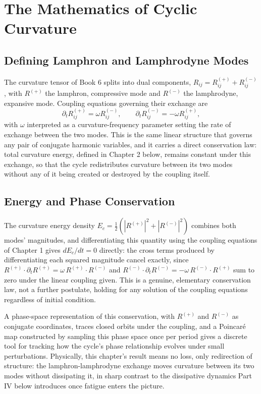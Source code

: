 \part{The Mathematics of Cyclic Curvature}

\chapter{Defining Lamphron and Lamphrodyne Modes}

The curvature tensor of Book 6 splits into dual components, $R_{ij} = R^{(+)}_{ij} + R^{(-)}_{ij}$, with $R^{(+)}$ the lamphron, compressive mode and $R^{(-)}$ the lamphrodyne, expansive mode. Coupling equations governing their exchange are
\[
\partial_t R^{(+)}_{ij} = \omega R^{(-)}_{ij}, \qquad \partial_t R^{(-)}_{ij} = -\omega R^{(+)}_{ij},
\]
with $\omega$ interpreted as a curvature-frequency parameter setting the rate of exchange between the two modes. This is the same linear structure that governs any pair of conjugate harmonic variables, and it carries a direct conservation law: total curvature energy, defined in Chapter 2 below, remains constant under this exchange, so that the cycle redistributes curvature between its two modes without any of it being created or destroyed by the coupling itself.

\chapter{Energy and Phase Conservation}

The curvature energy density $E_c = \tfrac{1}{2}(|R^{(+)}|^2 + |R^{(-)}|^2)$ combines both modes' magnitudes, and differentiating this quantity using the coupling equations of Chapter 1 gives $dE_c/dt = 0$ directly: the cross terms produced by differentiating each squared magnitude cancel exactly, since $R^{(+)} \cdot \partial_t R^{(+)} = \omega\, R^{(+)}\cdot R^{(-)}$ and $R^{(-)} \cdot \partial_t R^{(-)} = -\omega\, R^{(-)} \cdot R^{(+)}$ sum to zero under the linear coupling given. This is a genuine, elementary conservation law, not a further postulate, holding for any solution of the coupling equations regardless of initial condition.

A phase-space representation of this conservation, with $R^{(+)}$ and $R^{(-)}$ as conjugate coordinates, traces closed orbits under the coupling, and a Poincar\'e map constructed by sampling this phase space once per period gives a discrete tool for tracking how the cycle's phase relationship evolves under small perturbations. Physically, this chapter's result means no loss, only redirection of structure: the lamphron-lamphrodyne exchange moves curvature between its two modes without dissipating it, in sharp contrast to the dissipative dynamics Part IV below introduces once fatigue enters the picture.

